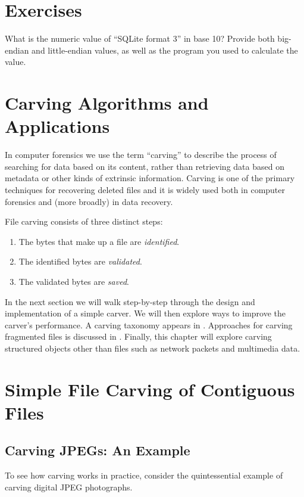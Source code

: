 \documentclass[11pt,letter]{article}
\begin{document}
\section{Exercises}

What is the numeric value of ``SQLite format 3'' in base 10? Provide
both big-endian and little-endian values, as well as the  program you
used to calculate the value. 

\section{Carving Algorithms and Applications}
In computer forensics we use the term  ``carving'' to describe the
process of searching for data based on its content, rather than
retrieving data based on metadata or other kinds of extrinsic
information. Carving is one of the primary techniques for recovering deleted
files and it is widely used both in computer forensics and (more
broadly) in data recovery.

File carving consists of three distinct steps:
\begin{enumerate}
\renewcommand{\theenumi}{Step (\arabic{enumi})}
\item The bytes that make up a file are \emph{identified}.
\item The identified bytes are \emph{validated}.\label{step-validate}
\item The validated bytes are \emph{saved}.\label{step-save}
\end{enumerate}

In the next section we will walk step-by-step through the design and
implementation of a simple carver. We will then explore ways to
improve the carver's performance. A carving taxonomy appears in
. Approaches for carving fragmented files is
discussed in . Finally, this chapter will
explore carving structured objects other than files such as network
packets and multimedia data.

\section{Simple File Carving of Contiguous Files}
\subsection{Carving JPEGs: An Example}

To see how carving works in practice, consider the quintessential 
example of carving digital JPEG photographs.
\end{document}
